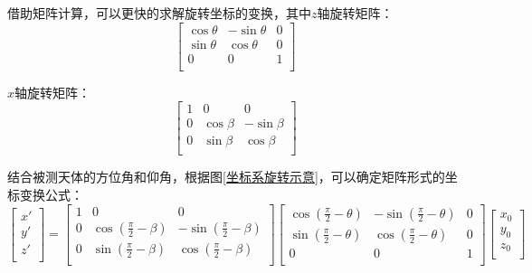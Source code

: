 \documentclass[withoutpreface,bwprint]{cumcmthesis} %
\begin{document}
	借助矩阵计算，可以更快的求解旋转坐标的变换，其中$z$轴旋转矩阵：
	\begin{equation}\label{z轴旋转矩阵}
	\left[ \begin{matrix}
	\cos  \theta &		-\sin  \theta &		0\\
	\sin  \theta &		\cos  \theta &		0\\
	0&		0&		1\\
	\end{matrix} \right] 
	\end{equation}
	
	$x$轴旋转矩阵：
	\begin{equation}\label{x轴旋转矩阵}
	\left[ \begin{matrix}
	1&		0&		0\\
	0&		\cos \beta &		-\sin  \beta \\
	0&		\sin \beta &		\cos  \beta \\
	\end{matrix} \right] 
	\end{equation}
	
	
	结合被测天体的方位角和仰角，根据图\ref{坐标系旋转示意}，可以确定矩阵形式的坐标变换公式：
	\begin{equation}\label{坐标变换矩阵}
	\left[ \begin{array}{c}
	x'\\
	y'\\
	z'\\
	\end{array} \right] =\left[ \begin{matrix}
	1&		0&		0\\
	0&		\cos \left( \frac{\pi}{2}-\beta \right)&		-\sin \left( \frac{\pi}{2}-\beta \right)\\
	0&		\sin \left( \frac{\pi}{2}-\beta \right)&		\cos \left( \frac{\pi}{2}-\beta \right)\\
	\end{matrix} \right] \left[ \begin{matrix}
	\cos \left( \frac{\pi}{2}-\theta \right)&		-\sin \left( \frac{\pi}{2}-\theta \right)&		0\\
	\sin \left( \frac{\pi}{2}-\theta \right)&		\cos \left( \frac{\pi}{2}-\theta \right)&		0\\
	0&		0&		1\\
	\end{matrix} \right] \left[ \begin{array}{c}
	x_0\\
	y_0\\
	z_0\\
	\end{array} \right] 
	\end{equation}
	
\end{document}
